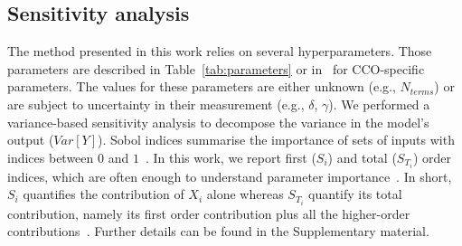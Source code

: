 \documentclass[11pt,]{article}
\let\oldequation\equation
\let\oldendequation\endequation
\renewenvironment{equation}
  {\linenomathNonumbers\oldequation}
  {\oldendequation\endlinenomath}
\begin{document}
\subsection{Sensitivity analysis}\label{sec:method-gsa}

The method presented in this work relies on several hyperparameters.
Those parameters are described in Table~\ref{tab:parameters} or in~\cite{Talou2021} for CCO-specific parameters.
The values for these parameters are either unknown (e.g., $N_{terms}$) or are subject to uncertainty in their measurement (e.g., $\delta$, $\gamma$).
We performed a variance-based sensitivity analysis to decompose the variance in the model's output ($Var[Y]$).
Sobol indices summarise the importance of sets of inputs with indices between $0$ and $1$~\cite{Saltelli2008}.
In this work, we report first ($S_i$) and total ($S_{T_i}$) order indices, which are often enough to understand parameter importance~\cite{Saltelli2008}.
In short, $S_i$ quantifies the contribution of $X_i$ alone whereas $S_{T_i}$ quantify its total contribution, namely its first order contribution plus all the higher-order contributions~\cite{Saltelli2008}.
Further details can be found in the Supplementary material.
\end{document}
